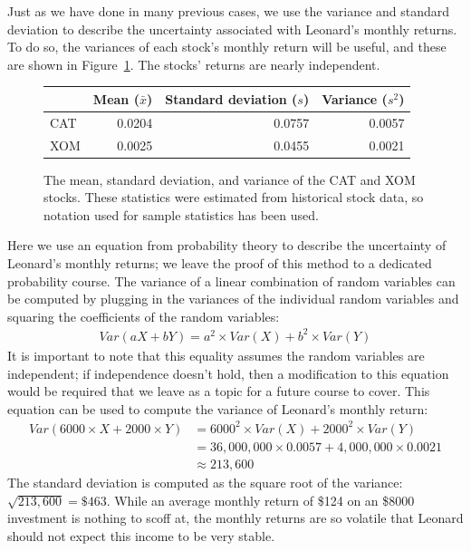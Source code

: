Just as we have done in many previous cases,
we use the variance and standard deviation to describe
the uncertainty associated with Leonard's monthly returns.
To do so, the variances of each stock's monthly return
will be useful, and these are shown in
Figure~\ref{sumStatOfCATXOM}.
The stocks' returns are nearly independent.

\begin{figure}
\centering
\begin{tabular}{lrrr}
\hline
    & Mean ($\bar{x}$) & Standard deviation ($s$) &
	    Variance ($s^2$) \\
\hline
CAT & 0.0204  & 0.0757  & 0.0057 \\
XOM & 0.0025  & 0.0455  & 0.0021 \\
\hline
\end{tabular}
\caption{The mean, standard deviation, and variance of the
    CAT and XOM stocks.
    These statistics were estimated from historical
    stock data, so notation used for sample statistics
    has been used.}
\label{sumStatOfCATXOM}
\end{figure}

Here we use an equation from probability theory to
describe the uncertainty of Leonard's monthly returns;
we leave the proof of this method to a dedicated
probability course.
The variance of a linear combination of random variables
can be computed by plugging in the variances of the
individual random variables and squaring the coefficients
of the random variables:
\begin{align*}
Var(aX + bY) = a^2\times Var(X) + b^2\times Var(Y)
\end{align*}
It is important to note that this equality assumes the
random variables are independent;
if independence doesn't hold, then a modification to
this equation would be required that we leave as a topic
for a future course to cover.
This equation can be used to compute the variance of
Leonard's monthly return:
\begin{align*}
Var(6000\times X + 2000\times Y)
	&= 6000^2\times Var(X) + 2000^2\times Var(Y) \\
	&= 36,000,000\times 0.0057 + 4,000,000\times 0.0021 \\
	&\approx 213,600
\end{align*}
The standard deviation is computed as the square root
of the variance: $\sqrt{213,600} = \$463$.
While an average monthly return of \$124 on an
\$8000 investment is nothing to scoff at,
the monthly returns are so volatile that Leonard should
not expect this income to be very stable.


